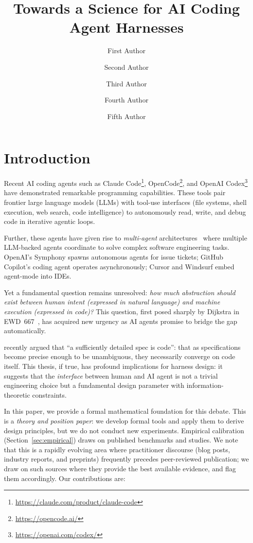 \documentclass[11pt, a4paper, logo, copyright]{googledeepmind}
\title{Towards a Science for AI Coding Agent Harnesses}
\author[1]{First Author}
\author[2]{Second Author}
\author[2]{Third Author}
\author[1]{Fourth Author}
\author[1]{Fifth Author}
\affil[*]{Equal Contribution}
\affil[1]{Affiliation 1}
\affil[2]{Affiliation 2}
\begin{document}
\maketitle


\section{Introduction}

Recent AI coding agents such as Claude Code\footnote{\url{https://claude.com/product/claude-code}}, OpenCode\footnote{\url{https://opencode.ai/}}, and OpenAI Codex\footnote{\url{https://openai.com/codex/}} have demonstrated remarkable programming capabilities. These tools pair frontier large language models (LLMs) with tool-use interfaces (file systems, shell execution, web search, code intelligence) to autonomously read, write, and debug code in iterative agentic loops.

Further, these agents have given rise to \emph{multi-agent} architectures~\citep{kim2025scaling} where multiple LLM-backed agents coordinate to solve complex software engineering tasks. OpenAI's Symphony spawns autonomous agents for issue tickets; GitHub Copilot's coding agent operates asynchronously; Cursor and Windsurf embed agent-mode into IDEs.

Yet a fundamental question remains unresolved: \emph{how much abstraction should exist between human intent (expressed in natural language) and machine execution (expressed in code)?} This question, first posed sharply by Dijkstra in EWD~667~\citep{dijkstra1978foolishness}, has acquired new urgency as AI agents promise to bridge the gap automatically.

\citet{gonzalez2026spec} recently argued that ``a sufficiently detailed spec is code'': that as specifications become precise enough to be unambiguous, they necessarily converge on code itself. This thesis, if true, has profound implications for harness design: it suggests that the \emph{interface} between human and AI agent is not a trivial engineering choice but a fundamental design parameter with information-theoretic constraints.

In this paper, we provide a formal mathematical foundation for this debate. This is a \emph{theory and position paper}: we develop formal tools and apply them to derive design principles, but we do not conduct new experiments. Empirical calibration (Section~\ref{sec:empirical}) draws on published benchmarks and studies. We note that this is a rapidly evolving area where practitioner discourse (blog posts, industry reports, and preprints) frequently precedes peer-reviewed publication; we draw on such sources where they provide the best available evidence, and flag them accordingly. Our contributions are:
\end{document}
